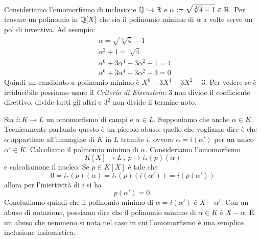 
\begin{esem}
Consideriamo l'omomorfismo di inclusione $\mathbb{Q} \hookrightarrow \mathbb{R}$ e $\alpha := \sqrt{\sqrt[3]{4} -1} \in \mathbb{R}$. Per trovare un polinomio in $\mathbb{Q}[X]$ che sia il polinomio minimo di $\alpha$ a volte serve un po' di inventiva. Ad esempio:
\begin{align*}
& \alpha = \sqrt{\sqrt[3]{4} -1} \\
& \alpha^2 + 1 = \sqrt[3]{4} \\
& \alpha^6 + 3\alpha^4 + 3\alpha^2 + 1 = 4 \\
& \alpha^6 + 3\alpha^4 + 3\alpha^2 - 3 = 0 .
\end{align*}
Quindi un candidato a polinomio minimo è $X^6 + 3X^4 + 3X^2 - 3$. Per vedere se è irriducibile possiamo usare il {\em Criterio di \textgerman{Eisenstein}}: $3$ non divide il coefficiente direttivo, divide tutti gli altri e $3^2$ non divide il termine noto.
\end{esem}

\begin{esem}
Sia $i : K \to L$ un omomorfismo di campi e $\alpha \in L$. Supponiamo che anche $\alpha \in K$. Tecnicamente parlando questo è un piccolo abuso: quello che vogliamo dire è che $\alpha$ appartiene all'immagine di $K$ in $L$ tramite $i$, ovvero $\alpha = i\left(\alpha'\right)$ per un unico $\alpha' \in K$. Calcoliamo il polinomio minimo di $\alpha$. Consideriamo l'omomorfismo
\[K[X] \to L \,,\ p \mapsto i_\ast (p)(\alpha)\]
e calcoliamone il nucleo. Se $p \in K[X]$ è tale che
\[0 = i_\ast(p)(\alpha) = i_\ast(p)\left(i\left(\alpha'\right)\right) = i\left(p\left(\alpha'\right)\right)\]
allora per l'iniettività di $i$ si ha
\[p\left(\alpha'\right) = 0 .\]
Concludiamo quindi che il polinomio minimo di $\alpha = i\left(\alpha'\right)$ è $X-\alpha'$. Con un abuso di notazione, possiamo dire che il polinomio minimo di $\alpha \in K$ è $X-\alpha$. È un abuso che nemmeno si nota nel caso in cui l'omomorfismo è una semplice inclusione insiemistica.
\end{esem}

